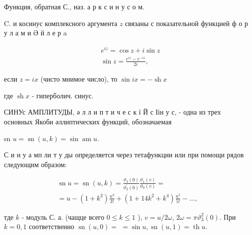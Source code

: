 \documentclass[10pt]{article}
\begin{document}
Функция, обратная С., наз. а р к с и н у с о м.



C. и косинус комплексного аргумента $z$ связаны с показательной функцией ф о р у л а м и Ә й л е р a



\[

\begin{aligned}

& e^{i z}=\cos z+i \sin z \\

& \sin z=\frac{e^{i z}-e^{-i z}}{2 i},

\end{aligned}

\]



если $z=i x$ (чисто мнимое число), то $\sin i x=-\operatorname{sh} x$



где $\operatorname{sh} x$ - гиперболич. синус.



СИНУс АМПЛИТУДЫ, ә л л и п т и ч е с к ї Й с Іін у с, - одна из трех основных Якоби әллиптических функций, обозначаемая



sn $u=\operatorname{sn}(u, k)=\sin \operatorname{am} u$.



С и н у а мп ли т у ды определяется через тетафункции или при помощи рядов следующим образом:



\[

\begin{gathered}

\operatorname{sn} u=\operatorname{sn}(u, k)=\frac{\vartheta_{3}(0)}{\vartheta_{2}^{\prime}(0)} \frac{\vartheta_{1}(v)}{\vartheta_{0}(v)}= \\

=u-\left(1+k^{2}\right) \frac{u^{3}}{3 !}+\left(1+14 k^{2}+k^{4}\right) \frac{u^{5}}{5 !}-\ldots,

\end{gathered}

\]



тде $k$ - модуль С. а. (чащце всего $0 \leqslant k \leqslant 1$ ), $v=u / 2 \omega$, $2 \omega=\pi \vartheta_{3}^{2}(0)$. При $k=0,1$ соответственно $\operatorname{sn}(u, 0)=$ $=\sin u, \operatorname{sn}(u, 1)=\operatorname{th} u$.
\end{document}

